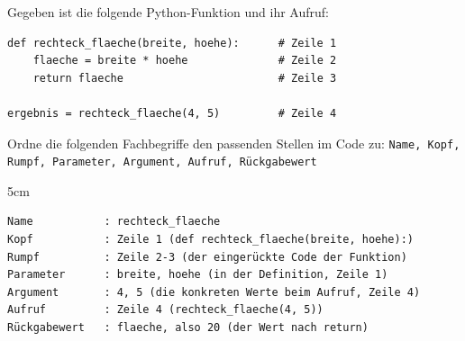 \question[4]
Gegeben ist die folgende Python-Funktion und ihr Aufruf:

\begin{lstlisting}
def rechteck_flaeche(breite, hoehe):      # Zeile 1
    flaeche = breite * hoehe              # Zeile 2
    return flaeche                        # Zeile 3

ergebnis = rechteck_flaeche(4, 5)         # Zeile 4
\end{lstlisting}

Ordne die folgenden Fachbegriffe den passenden Stellen im Code zu:
\texttt{Name, Kopf, Rumpf, Parameter, Argument, Aufruf, Rückgabewert}

\begin{solutionbox}{5cm}
\begin{lstlisting}[language={}]
Name           : rechteck_flaeche
Kopf           : Zeile 1 (def rechteck_flaeche(breite, hoehe):)
Rumpf          : Zeile 2-3 (der eingerückte Code der Funktion)
Parameter      : breite, hoehe (in der Definition, Zeile 1)
Argument       : 4, 5 (die konkreten Werte beim Aufruf, Zeile 4)
Aufruf         : Zeile 4 (rechteck_flaeche(4, 5))
Rückgabewert   : flaeche, also 20 (der Wert nach return)
\end{lstlisting}
\end{solutionbox}